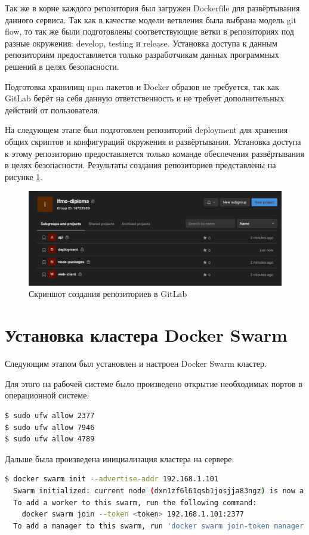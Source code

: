 Так же в корне каждого репозитория был загружен Dockerfile для развёртывания данного сервиса.
Так как в качестве модели ветвления была выбрана модель git flow, то так же были подготовлены соответствующие ветки в репозиториях под разные окружения: develop, testing и release.
Установка доступа к данным репозиториям предоставляется только разработчикам данных программных решений в целях безопасности.

Подготовка хранилищ npm\cite{web:npm:docs} пакетов и Docker образов не требуется, так как GitLab берёт на себя данную ответственность и не требует дополнительных действий от пользователя.

На следующем этапе был подготовлен репозиторий deployment для хранения общих скриптов и конфигураций окружения и развёртывания.
Установка доступа к этому репозиторию предоставляется только команде обеспечения развёртывания в целях безопасности.
Результаты создания репозиториев представлены на рисунке \ref{fig:reps-ready}.

\begin{figure}[ht]
    \centering
    \includegraphics[scale=0.4]{src/figures/reps-ready}
    \caption{Скриншот создания репозиториев в GitLab}
    \label{fig:reps-ready}
\end{figure}

\section{Установка кластера Docker Swarm}

Следующим этапом был установлен и настроен Docker Swarm кластер.

Для этого на рабочей системе было произведено открытие необходимых портов в операционной системе\cite{linuxPocket}:
\begin{lstlisting}[language=bash,caption={Открытие портов в Linux}]
$ sudo ufw allow 2377
$ sudo ufw allow 7946
$ sudo ufw allow 4789
\end{lstlisting}

Дальше была произведена инициализация кластера на сервере:
\begin{lstlisting}[language=bash,caption={Инициализация кластера}]
$ docker swarm init --advertise-addr 192.168.1.101
  Swarm initialized: current node (dxn1zf6l61qsb1josjja83ngz) is now a manager.
  To add a worker to this swarm, run the following command:
    docker swarm join --token <token> 192.168.1.101:2377
  To add a manager to this swarm, run 'docker swarm join-token manager' and follow the instructions.
\end{lstlisting}

